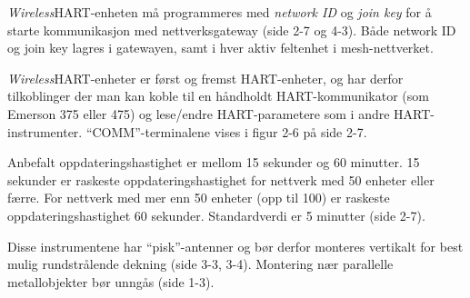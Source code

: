 







\textsl{Wireless}HART-enheten må programmeres med \textit{network ID} og \textit{join key} for å starte kommunikasjon med nettverksgateway (side 2-7 og 4-3). Både network ID og join key lagres i gatewayen, samt i hver aktiv feltenhet i mesh-nettverket.

\vskip 10pt

\textsl{Wireless}HART-enheter er først og fremst HART-enheter, og har derfor tilkoblinger der man kan koble til en håndholdt HART-kommunikator (som Emerson 375 eller 475) og lese/endre HART-parametere som i andre HART-instrumenter. ``COMM''-terminalene vises i figur 2-6 på side 2-7.

\vskip 10pt

Anbefalt oppdateringshastighet er mellom 15 sekunder og 60 minutter. 15 sekunder er raskeste oppdateringshastighet for nettverk med 50 enheter eller færre. For nettverk med mer enn 50 enheter (opp til 100) er raskeste oppdateringshastighet 60 sekunder. Standardverdi er 5 minutter (side 2-7).

\vskip 10pt

Disse instrumentene har ``pisk''-antenner og bør derfor monteres vertikalt for best mulig rundstrålende dekning (side 3-3, 3-4). Montering nær parallelle metallobjekter bør unngås (side 1-3).


